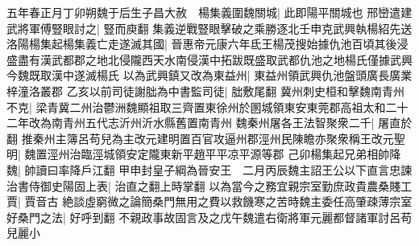 五年春正月丁卯朔魏于后生子昌大赦　楊集義圍魏關城|{
	此即陽平關城也}
邢巒遣建武將軍傅豎眼討之|{
	豎而庾翻}
集義逆戰豎眼擊破之乘勝逐北壬申克武興執楊紹先送洛陽楊集起楊集義亡走遂滅其國|{
	晉惠帝元康六年氐王楊茂搜始據仇池百頃其後浸盛盡有漢武都郡之地北侵隴西天水南侵漢中拓跋既盛取武都仇池之地楊氏僅據武興今魏既取漢中遂滅楊氏}
以為武興鎮又改為東益州|{
	東益州領武興仇池盤頭廣長廣業梓潼洛叢郡}
乙亥以前司徒謝朏為中書監司徒|{
	朏敷尾翻}
冀州刺史桓和擊魏南青州不克|{
	梁青冀二州治鬱洲魏顯祖取三齊置東徐州於圂城領東安東莞郡高祖太和二十二年改為南青州五代志沂州沂水縣舊置南青州}
魏秦州屠各王法智聚衆二千|{
	屠直於翻}
推秦州主簿呂苟兒為主改元建明置百官攻逼州郡涇州民陳瞻亦聚衆稱王改元聖明|{
	魏置涇州治臨涇城領安定隴東新平趙平平凉平源等郡}
己卯楊集起兄弟相帥降魏|{
	帥讀曰率降戶江翻}
甲申封皇子綱為晉安王　二月丙辰魏主詔王公以下直言忠諫治書侍御史陽固上表|{
	治直之翻上時掌翻}
以為當今之務宜親宗室勤庶政貴農桑賤工賈|{
	賈音古}
絶談虛窮微之論簡桑門無用之費以救饑寒之苦時魏主委任高肇疎薄宗室好桑門之法|{
	好呼到翻}
不親政事故固言及之戊午魏遣右衛將軍元麗都督諸軍討呂苟兒麗小


